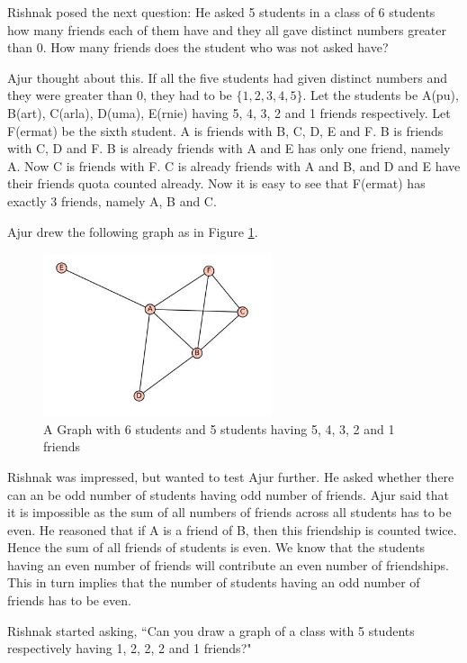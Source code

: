 Rishnak posed the next question: He asked 5 students in a class of 6 students how many friends each of them have and they all gave distinct numbers greater than 0. How many friends does the student who was not asked have?

Ajur thought about this. If all the five students had given distinct numbers and they were greater than 0, they had to be $\{1,2,3,4,5\}$. Let the students be A(pu), B(art), C(arla), D(uma), E(rnie) having 5, 4, 3, 2 and 1 friends respectively. Let F(ermat) be the sixth student. A is friends with B, C, D, E and F. B is friends with C, D and F. B is already friends with A and E has only one friend, namely A. Now C is friends with F. C is already friends with A and B, and D and E have their friends quota counted already. 
Now it is easy to see that F(ermat) has exactly 3 friends, namely A, B and C.

Ajur drew the following graph as in Figure \ref{dg2}.

\begin{figure}
\begin{center}
\includegraphics[width=0.6\textwidth]{graphstory1-1.JPG}
\caption{A Graph with 6 students and 5 students having 5, 4, 3, 2 and 1 friends}\label{dg2}
\end{center}
\end{figure}

Rishnak was impressed, but wanted to test Ajur further. He asked whether there can an be odd number of students having odd number of friends. Ajur said that it is impossible as the sum of all numbers of friends across all students has to be even. He reasoned that if A is a friend of B, then this friendship is counted twice. Hence the sum of all friends of students is even. We know that the students having an even number of friends will contribute an even number of friendships. This in turn implies that the number of students having an odd number of friends has to be even.


Rishnak started asking, ``Can you draw a graph of a class with 5 students respectively having 1, 2, 2, 2 and 1 friends?"

